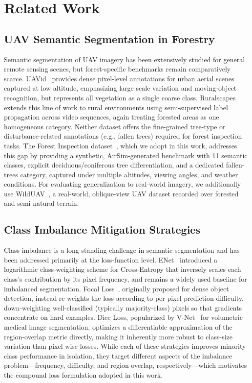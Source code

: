 \documentclass[journal,compsoc]{IEEEtran}
\begin{document}
\section{Related Work}
\label{sec:related_work}

\subsection{UAV Semantic Segmentation in Forestry}
Semantic segmentation of UAV imagery has been extensively studied for general remote sensing scenes, but forest-specific benchmarks remain comparatively scarce. UAVid~\cite{lyu2020uavid} provides dense pixel-level annotations for urban aerial scenes captured at low altitude, emphasizing large scale variation and moving-object recognition, but represents all vegetation as a single coarse class. Ruralscapes~\cite{marcu2020semantics} extends this line of work to rural environments using semi-supervised label propagation across video sequences, again treating forested areas as one homogeneous category. Neither dataset offers the fine-grained tree-type or disturbance-related annotations (e.g., fallen trees) required for forest inspection tasks. The Forest Inspection dataset~\cite{forestdataset}, which we adopt in this work, addresses this gap by providing a synthetic, AirSim-generated benchmark with 11 semantic classes, explicit deciduous/coniferous tree differentiation, and a dedicated fallen-trees category, captured under multiple altitudes, viewing angles, and weather conditions. For evaluating generalization to real-world imagery, we additionally use WildUAV~\cite{florea2021wilduav}, a real-world, oblique-view UAV dataset recorded over forested and semi-natural terrain.

\subsection{Class Imbalance Mitigation Strategies}
Class imbalance is a long-standing challenge in semantic segmentation and has been addressed primarily at the loss-function level. ENet~\cite{paszke2016enet} introduced a logarithmic class-weighting scheme for Cross-Entropy that inversely scales each class's contribution by its pixel frequency, and remains a widely used baseline for imbalanced segmentation. Focal Loss~\cite{lin2017focal}, originally proposed for dense object detection, instead re-weights the loss according to per-pixel prediction difficulty, down-weighting well-classified (typically majority-class) pixels so that gradients concentrate on hard examples. Dice Loss, popularized by V-Net~\cite{milletari2016vnet} for volumetric medical image segmentation, optimizes a differentiable approximation of the region-overlap metric directly, making it inherently more robust to class-size variation than pixel-wise losses. While each of these strategies improves minority-class performance in isolation, they target different aspects of the imbalance problem---frequency, difficulty, and region overlap, respectively---which motivates the compound loss formulation adopted in this work.
\end{document}
